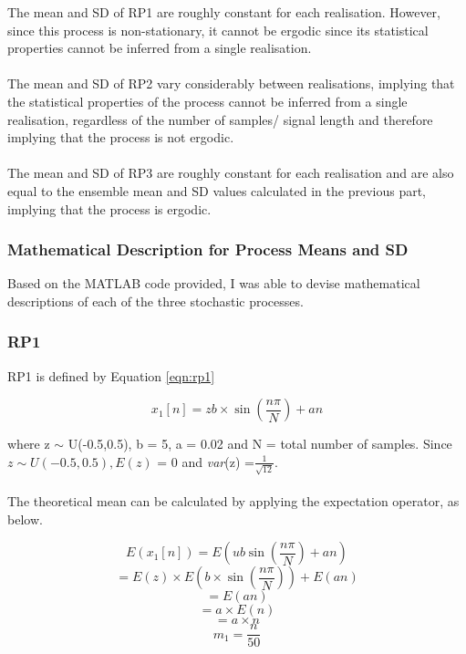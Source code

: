 \noindent
The mean and SD of RP1 are roughly constant for each realisation. However, since this process is non-stationary, it cannot be ergodic since its statistical properties cannot be inferred from a single realisation.
\\\\
The mean and SD of RP2 vary considerably between realisations, implying that the statistical properties of the process cannot be inferred from a single realisation, regardless of the number of samples/ signal length and therefore implying that the process is not ergodic.
\\\\
The mean and SD of RP3 are roughly constant for each realisation and are also equal to the ensemble mean and SD values calculated in the previous part, implying that the process is ergodic.

\subsubsection{Mathematical Description for Process Means and SD}

Based on the MATLAB code provided, I was able to devise mathematical descriptions of each of the three stochastic processes.

\subsubsection*{RP1}

RP1 is defined by Equation \ref{eqn:rp1}

\begin{equation}
    x_{1}[n] = zb \times \sin \left(\frac{n \pi}{N}\right) + an
    \label{eqn:rp1}
\end{equation}

\noindent
where z $\sim$ U(-0.5,0.5), b = 5, a = 0.02 and N = total number of samples. Since $z \sim U(-0.5,0.5), E(z)$ = 0 and \textit{var}(z) =$ \frac{1}{\sqrt{12}}$.
\\\\
The theoretical mean can be calculated by applying the expectation operator, as below.

\begin{center}
\begin{equation}
    E(x_{1}[n]) = E(ub \sin \left(\frac{n \pi}{N}\right) + an) 
\end{equation}
\begin{equation}
= E(z)\times E(b \times \sin \left(\frac{n \pi}{N}\right)) + E(an) 
\end{equation}
\begin{equation}
= E(an) 
\end{equation}
\begin{equation}
= a \times E(n) 
\end{equation}
\begin{equation}
    = a \times n
\end{equation}
\begin{equation}
m_{1}= \frac{n}{50}
\end{equation}
\end{center}

